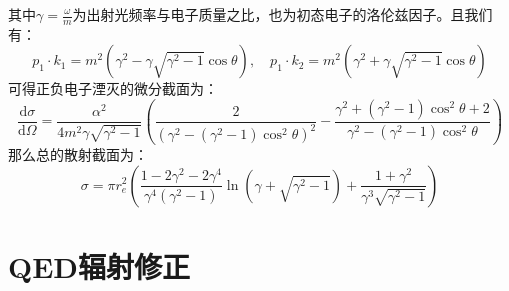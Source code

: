 其中$\gamma=\frac{\omega}{m}$为出射光频率与电子质量之比，也为初态电子的洛伦兹因子。且我们有：
\begin{equation}
p_1\cdot k_1=m^2(\gamma^2-\gamma\sqrt{\gamma^2-1}\cos\theta),\quad p_1\cdot k_2=m^2(\gamma^2+\gamma\sqrt{\gamma^2-1}\cos\theta)
\end{equation}
可得正负电子湮灭的微分截面为：
\begin{equation}
\frac{\mathrm{d}\sigma}{\mathrm{d}\Omega}=\frac{\alpha^2}{4m^2\gamma\sqrt{\gamma^2-1}}\left(\frac{2}{(\gamma^2-(\gamma^2-1)\cos^2\theta)^2}-\frac{\gamma^2+(\gamma^2-1)\cos^2\theta+2}{\gamma^2-(\gamma^2-1)\cos^2\theta}\right)
\end{equation}
那么总的散射截面为：
\begin{equation}
\sigma={\pi r_e^2}\left(\frac{1-2\gamma^2-2\gamma^4}{\gamma^4(\gamma^2-1)}\ln\left(\gamma+\sqrt{\gamma^2-1}\right)+\frac{1+\gamma^2}{\gamma^3\sqrt{\gamma^2-1}}\right)
\end{equation}


\section{QED辐射修正}
